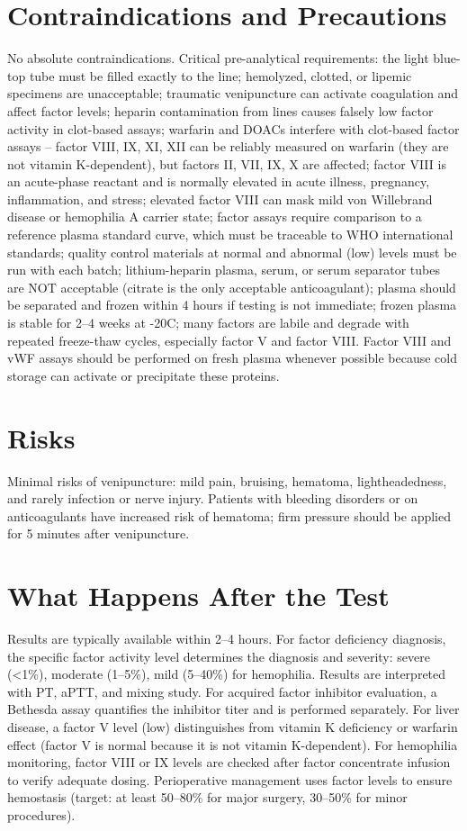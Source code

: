 \section*{Contraindications and Precautions}
No absolute contraindications. Critical pre-analytical requirements: the light blue-top tube must be filled exactly to the line; hemolyzed, clotted, or lipemic specimens are unacceptable; traumatic venipuncture can activate coagulation and affect factor levels; heparin contamination from lines causes falsely low factor activity in clot-based assays; warfarin and DOACs interfere with clot-based factor assays -- factor VIII, IX, XI, XII can be reliably measured on warfarin (they are not vitamin K-dependent), but factors II, VII, IX, X are affected; factor VIII is an acute-phase reactant and is normally elevated in acute illness, pregnancy, inflammation, and stress; elevated factor VIII can mask mild von Willebrand disease or hemophilia A carrier state; factor assays require comparison to a reference plasma standard curve, which must be traceable to WHO international standards; quality control materials at normal and abnormal (low) levels must be run with each batch; lithium-heparin plasma, serum, or serum separator tubes are NOT acceptable (citrate is the only acceptable anticoagulant); plasma should be separated and frozen within 4 hours if testing is not immediate; frozen plasma is stable for 2--4 weeks at -20\textdegree{}C; many factors are labile and degrade with repeated freeze-thaw cycles, especially factor V and factor VIII. Factor VIII and vWF assays should be performed on fresh plasma whenever possible because cold storage can activate or precipitate these proteins.

\section*{Risks}
Minimal risks of venipuncture: mild pain, bruising, hematoma, lightheadedness, and rarely infection or nerve injury. Patients with bleeding disorders or on anticoagulants have increased risk of hematoma; firm pressure should be applied for 5 minutes after venipuncture.

\section*{What Happens After the Test}
Results are typically available within 2--4 hours. For factor deficiency diagnosis, the specific factor activity level determines the diagnosis and severity: severe (<1\%), moderate (1--5\%), mild (5--40\%) for hemophilia. Results are interpreted with PT, aPTT, and mixing study. For acquired factor inhibitor evaluation, a Bethesda assay quantifies the inhibitor titer and is performed separately. For liver disease, a factor V level (low) distinguishes from vitamin K deficiency or warfarin effect (factor V is normal because it is not vitamin K-dependent). For hemophilia monitoring, factor VIII or IX levels are checked after factor concentrate infusion to verify adequate dosing. Perioperative management uses factor levels to ensure hemostasis (target: at least 50--80\% for major surgery, 30--50\% for minor procedures).

